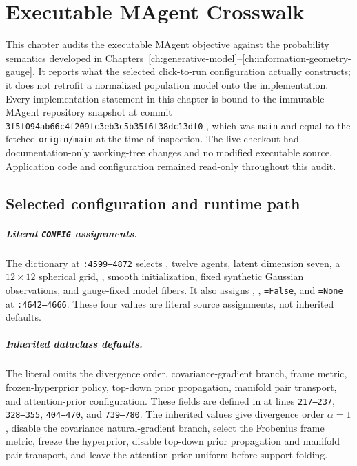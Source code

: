 \chapter{Executable MAgent Crosswalk}
\label{ch:executable-crosswalk}

This chapter audits the executable MAgent objective against the probability semantics developed in Chapters~\ref{ch:generative-model}--\ref{ch:information-geometry-gauge}. It reports what the selected click-to-run configuration actually constructs; it does not retrofit a normalized population model onto the implementation. Every implementation statement in this chapter is bound to the immutable MAgent repository snapshot at commit \texttt{3f5f094ab66c4f209fc3eb3c5b35f6f38dc13df0} \citep{Dennis2026MAgentSnapshot}, which was \texttt{main} and equal to the fetched \texttt{origin/main} at the time of inspection. The live checkout had documentation-only working-tree changes and no modified executable source. Application code and configuration remained read-only throughout this audit.

\section{Selected configuration and runtime path}

\paragraph{Literal \texttt{CONFIG} assignments.}
The dictionary at \allowbreak\texttt{:4599--4872} selects , twelve agents, latent dimension seven, a $12\times12$ spherical grid, , smooth initialization, fixed synthetic Gaussian observations, and gauge-fixed model fibers.
It also assigns , , \allowbreak\texttt{=False}, and \allowbreak\texttt{=None} at \allowbreak\texttt{:4642--4666}.
These four values are literal source assignments, not inherited defaults.

\paragraph{Inherited dataclass defaults.}
The literal omits the divergence order, covariance-gradient branch, frame metric, frozen-hyperprior policy, top-down prior propagation, manifold pair transport, and attention-prior configuration.
These fields are defined in  at lines \texttt{217--237}, \texttt{328--355}, \texttt{404--470}, and \texttt{739--780}.
The inherited values give divergence order $\alpha=1$, disable the covariance natural-gradient branch, select the Frobenius frame metric, freeze the hyperprior, disable top-down prior propagation and manifold pair transport, and leave the attention prior uniform before support folding.


